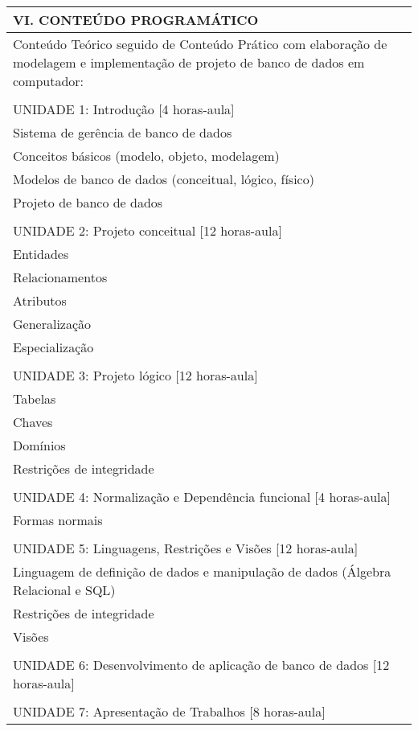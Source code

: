 \documentclass[12pt]{article}
\begin{document}
\begin{longtable}{|L{1.025\textwidth}|} \hline
%
{\bf VI. CONTEÚDO PROGRAMÁTICO } \\ \hline
Conteúdo Teórico seguido de Conteúdo Prático com elaboração de modelagem e implementação de projeto de banco de dados em computador: \\
\\
UNIDADE 1: Introdução [4 horas-aula]\\
Sistema de gerência de banco de dados\\
Conceitos básicos (modelo, objeto, modelagem)\\
Modelos de banco de dados (conceitual, lógico, físico)\\
Projeto de banco de dados\\
\\
UNIDADE 2: Projeto conceitual [12 horas-aula]\\
 Entidades\\
 Relacionamentos\\
 Atributos\\
 Generalização\\
 Especialização\\
\\
UNIDADE 3: Projeto lógico [12 horas-aula]\\
 Tabelas\\
 Chaves\\
 Domínios\\
Restrições de integridade\\
\\
UNIDADE 4: Normalização e Dependência funcional [4 horas-aula]\\
Formas normais\\
\\
UNIDADE 5: Linguagens, Restrições e Visões [12 horas-aula]\\
 Linguagem de definição de dados e manipulação de dados (Álgebra Relacional e SQL)\\
 Restrições de integridade\\
 Visões\\
\\
UNIDADE 6: Desenvolvimento de aplicação de banco de dados [12 horas-aula]\\
\\
UNIDADE 7: Apresentação de Trabalhos [8 horas-aula]

\\ \hline
\end{longtable} 
\end{document}
